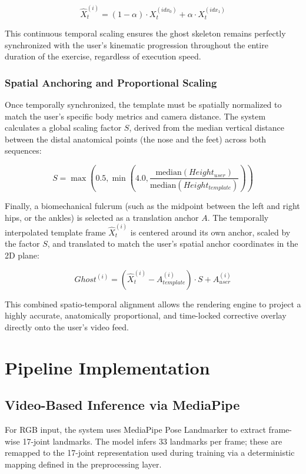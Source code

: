 \begin{equation}
\hat{X}_t^{(i)} = (1 - \alpha) \cdot X_t^{(idx_0)} + \alpha \cdot X_t^{(idx_1)}
\end{equation}

This continuous temporal scaling ensures the ghost skeleton remains perfectly synchronized with the user's kinematic progression throughout the entire duration of the exercise, regardless of execution speed.

\subsubsection*{Spatial Anchoring and Proportional Scaling}
Once temporally synchronized, the template must be spatially normalized to match the user's specific body metrics and camera distance. The system calculates a global scaling factor $S$, derived from the median vertical distance between the distal anatomical points (the nose and the feet) across both sequences:

\begin{equation}
S = \max \left(0.5, \min \left(4.0, \frac{\text{median}(Height_{user})}{\text{median}(Height_{template})}\right)\right)
\end{equation}

Finally, a biomechanical fulcrum (such as the midpoint between the left and right hips, or the ankles) is selected as a translation anchor $A$. The temporally interpolated template frame $\hat{X}_t^{(i)}$ is centered around its own anchor, scaled by the factor $S$, and translated to match the user's spatial anchor coordinates in the 2D plane:

\begin{equation}
Ghost^{(i)} = (\hat{X}_t^{(i)} - A_{template}^{(i)}) \cdot S + A_{user}^{(i)}
\end{equation}

This combined spatio-temporal alignment allows the rendering engine to project a highly accurate, anatomically proportional, and time-locked corrective overlay directly onto the user's video feed.

\section{Pipeline Implementation}

\subsection{Video-Based Inference via MediaPipe}
For RGB input, the system uses MediaPipe Pose Landmarker to extract frame-wise 17-joint landmarks. The model infers 33 landmarks per frame; these are remapped to the 17-joint representation used during training via a deterministic mapping defined in the preprocessing layer.

